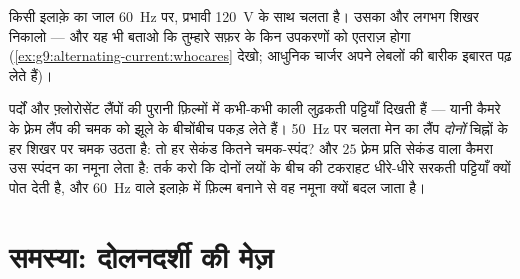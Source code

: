 \begin{exercise}[$\star\star$]\label{exo:g9:alternating-current:11}
किसी इलाक़े का जाल \qty{60}{Hz} पर, प्रभावी \qty{120}{V} के साथ चलता
है। उसका  और लगभग शिखर  निकालो --- और यह भी बताओ कि
तुम्हारे सफ़र के किन उपकरणों को एतराज़ होगा
(\cref{ex:g9:alternating-current:whocares} देखो; आधुनिक चार्जर अपने
लेबलों की बारीक इबारत पढ़ लेते हैं)।
\end{exercise}

\begin{exercise}[$\star\star\star$]\label{exo:g9:alternating-current:12}
पर्दों और फ़्लोरोसेंट लैंपों की पुरानी फ़िल्मों में कभी-कभी काली
लुढ़कती पट्टियाँ दिखती हैं --- यानी कैमरे के फ़्रेम लैंप की चमक को झूले
के बीचोंबीच पकड़ लेते हैं। \qty{50}{Hz} पर चलता मेन का लैंप
\emph{दोनों} चिह्नों के हर शिखर पर चमक उठता है: तो हर सेकंड कितने
चमक-स्पंद? और $25$ फ़्रेम प्रति सेकंड वाला कैमरा उस स्पंदन का नमूना
लेता है: तर्क करो कि दोनों लयों के बीच की टकराहट धीरे-धीरे सरकती
पट्टियाँ क्यों पोत देती है, और \qty{60}{Hz} वाले इलाक़े में फ़िल्म
बनाने से वह नमूना क्यों बदल जाता है।
\end{exercise}

\section{समस्या: दोलनदर्शी की मेज़}

